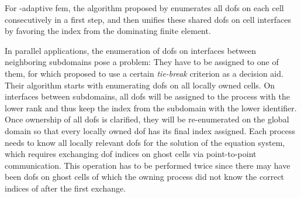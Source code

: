 For \hp-adaptive \gls{fem}, the algorithm proposed by \textcite[Sec.~4.2]{bangerth2009} enumerates all \glspl{dof} on each cell consecutively in a first step, and then unifies these shared \glspl{dof} on cell interfaces by favoring the index from the dominating finite element.





In parallel applications, the enumeration of \glspl{dof} on interfaces between neighboring subdomains pose a problem: They have to be assigned to one of them, for which \textcite[Sec.~3.1]{bangerth2012} proposed to use a certain \textit{tie-break} criterion as a decision aid. Their algorithm starts with enumerating \glspl{dof} on all locally owned cells. On interfaces between subdomains, all \glspl{dof} will be assigned to the process with the lower rank and thus keep the index from the subdomain with the lower identifier. Once ownership of all \glspl{dof} is clarified, they will be re-enumerated on the global domain so that every locally owned \gls{dof} has its final index assigned. Each process needs to know all locally relevant \glspl{dof} for the solution of the equation system, which requires exchanging \gls{dof} indices on ghost cells via point-to-point communication. This operation has to be performed twice since there may have been \glspl{dof} on ghost cells of which the owning process did not know the correct indices of after the first exchange.


